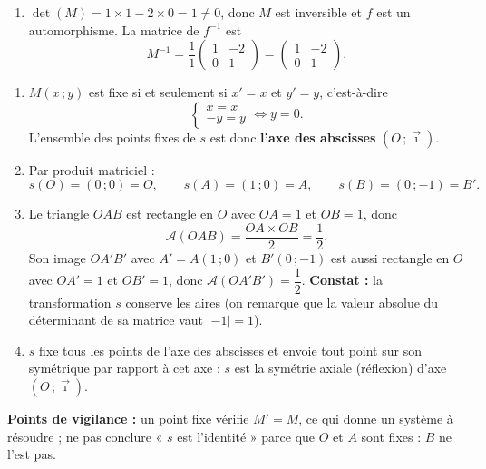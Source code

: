 \documentclass[11pt]{article}
\newcommand{\cle}[1]{{\popxbold\color{popdark}#1}}
\begin{document}
\begin{corrige}
\begin{enumerate}
\item $\det(M)=1\times1-2\times0=1\neq0$, donc $M$ est inversible et $f$ est un automorphisme. La matrice de $f^{-1}$ est
\[ M^{-1}=\frac{1}{1}\begin{pmatrix} 1 & -2 \\ 0 & 1 \end{pmatrix}=\begin{pmatrix} 1 & -2 \\ 0 & 1 \end{pmatrix}. \]
\end{enumerate}
\end{corrige}

\begin{corrige}
\begin{enumerate}
\item $M(x\,;y)$ est fixe si et seulement si $x'=x$ et $y'=y$, c'est-à-dire
\[ \begin{cases} x=x \\ -y=y \end{cases}\iff y=0. \]
L'ensemble des points fixes de $s$ est donc \textbf{l'axe des abscisses} $(O\,;\vec{\imath})$.

\item Par produit matriciel :
\[ s(O)=(0\,;0)=O,\qquad s(A)=(1\,;0)=A,\qquad s(B)=(0\,;-1)=B'. \]

\item Le triangle $OAB$ est rectangle en $O$ avec $OA=1$ et $OB=1$, donc
\[ \mathcal{A}(OAB)=\frac{OA\times OB}{2}=\frac{1}{2}. \]
Son image $OA'B'$ avec $A'=A(1\,;0)$ et $B'(0\,;-1)$ est aussi rectangle en $O$ avec $OA'=1$ et $OB'=1$, donc $\mathcal{A}(OA'B')=\dfrac{1}{2}$. \textbf{Constat :} la transformation $s$ conserve les aires (on remarque que la valeur absolue du déterminant de sa matrice vaut $|{-1}|=1$).

\item $s$ fixe tous les points de l'axe des abscisses et envoie tout point sur son symétrique par rapport à cet axe : $s$ est la \cle{symétrie axiale} (réflexion) d'axe $(O\,;\vec{\imath})$.
\end{enumerate}
\textbf{Points de vigilance :} un point fixe vérifie $M'=M$, ce qui donne un système à résoudre ; ne pas conclure « $s$ est l'identité » parce que $O$ et $A$ sont fixes : $B$ ne l'est pas.
\end{corrige}
\end{document}
